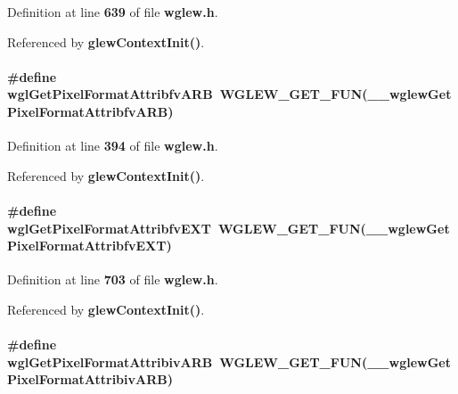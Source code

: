 Definition at line {\bf 639} of file {\bf wglew.\+h}.



Referenced by {\bf glew\+Context\+Init()}.

\paragraph[{wgl\+Get\+Pixel\+Format\+Attribfv\+A\+RB}]{\setlength{\rightskip}{0pt plus 5cm}\#define wgl\+Get\+Pixel\+Format\+Attribfv\+A\+RB~{\bf W\+G\+L\+E\+W\+\_\+\+G\+E\+T\+\_\+\+F\+UN}({\bf \+\_\+\+\_\+wglew\+Get\+Pixel\+Format\+Attribfv\+A\+RB})}\label{wglew_8h_a1fd864e9fd93c12a28350cf391ef4f28}


Definition at line {\bf 394} of file {\bf wglew.\+h}.



Referenced by {\bf glew\+Context\+Init()}.

\paragraph[{wgl\+Get\+Pixel\+Format\+Attribfv\+E\+XT}]{\setlength{\rightskip}{0pt plus 5cm}\#define wgl\+Get\+Pixel\+Format\+Attribfv\+E\+XT~{\bf W\+G\+L\+E\+W\+\_\+\+G\+E\+T\+\_\+\+F\+UN}({\bf \+\_\+\+\_\+wglew\+Get\+Pixel\+Format\+Attribfv\+E\+XT})}\label{wglew_8h_a848e0d2a007834f01272af0422262198}


Definition at line {\bf 703} of file {\bf wglew.\+h}.



Referenced by {\bf glew\+Context\+Init()}.

\paragraph[{wgl\+Get\+Pixel\+Format\+Attribiv\+A\+RB}]{\setlength{\rightskip}{0pt plus 5cm}\#define wgl\+Get\+Pixel\+Format\+Attribiv\+A\+RB~{\bf W\+G\+L\+E\+W\+\_\+\+G\+E\+T\+\_\+\+F\+UN}({\bf \+\_\+\+\_\+wglew\+Get\+Pixel\+Format\+Attribiv\+A\+RB})}\label{wglew_8h_a8edcc08abf2e74d0331fdfe925e98199}


